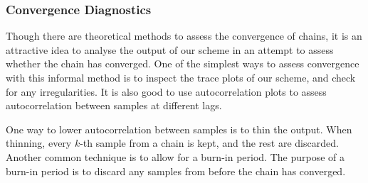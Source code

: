 \subsubsection*{Convergence Diagnostics}
\label{sssec:convergence_diagnostics}
Though there are theoretical methods to assess the convergence of chains, it is an attractive idea to analyse the output of our scheme in an attempt to assess whether the chain has converged. One of the simplest ways to assess convergence with this informal method is to inspect the trace plots of our scheme, and check for any irregularities. It is also good to use autocorrelation plots to assess autocorrelation between samples at different lags.

One way to lower autocorrelation between samples is to thin the output. When thinning, every $k$-th sample from a chain is kept, and the rest are discarded. Another common technique is to allow for a burn-in period. The purpose of a burn-in period is to discard any samples from before the chain has converged.